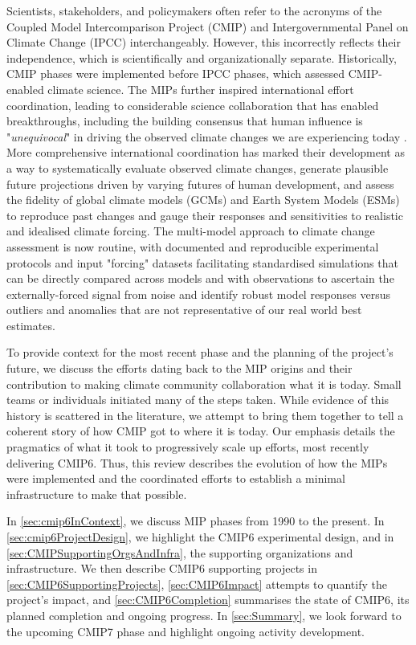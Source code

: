 \documentclass[manuscript]{copernicus}
\begin{document}
Scientists, stakeholders, and policymakers often refer to the acronyms of the Coupled Model Intercomparison Project (CMIP) and Intergovernmental Panel on Climate Change (IPCC) interchangeably. However, this incorrectly reflects their independence, which is scientifically and organizationally separate. Historically, CMIP phases were implemented before IPCC phases, which assessed CMIP-enabled climate science. The MIPs further inspired international effort coordination, leading to considerable science collaboration that has enabled breakthroughs, including the building consensus that human influence is "\textit{unequivocal}" in driving the observed climate changes we are experiencing today \citep[see \autoref{fig:fig6-MIPImpact};][]{eyring_human_2021}. More comprehensive international coordination has marked their development as a way to systematically evaluate observed climate changes, generate plausible future projections driven by varying futures of human development, and assess the fidelity of global climate models (GCMs) and Earth System Models (ESMs) to reproduce past changes and gauge their responses and sensitivities to realistic and idealised climate forcing. The multi-model approach to climate change assessment is now routine, with documented and reproducible experimental protocols and input "forcing" datasets facilitating standardised simulations that can be directly compared across models and with observations to ascertain the externally-forced signal from noise and identify robust model responses versus outliers and anomalies that are not representative of our real world best estimates.

To provide context for the most recent phase \citep[CMIP6;][]{eyring_overview_2016} and the planning of the project’s future, we discuss the efforts dating back to the MIP origins and their contribution to making climate community collaboration what it is today. Small teams or individuals initiated many of the steps taken. While evidence of this history is scattered in the literature, we attempt to bring them together to tell a coherent story of how CMIP got to where it is today. Our emphasis details the pragmatics of what it took to progressively scale up efforts, most recently delivering CMIP6. Thus, this review describes the evolution of how the MIPs were implemented and the coordinated efforts to establish a minimal infrastructure to make that possible.

In \autoref{sec:cmip6InContext}, we discuss MIP phases from 1990 to the present. In \autoref{sec:cmip6ProjectDesign}, we highlight the CMIP6 experimental design, and in \autoref{sec:CMIPSupportingOrgsAndInfra}, the supporting organizations and infrastructure. We then describe CMIP6 supporting projects in \autoref{sec:CMIP6SupportingProjects}, \autoref{sec:CMIP6Impact} attempts to quantify the project's impact, and \autoref{sec:CMIP6Completion} summarises the state of CMIP6, its planned completion and ongoing progress. In \autoref{sec:Summary}, we look forward to the upcoming CMIP7 phase and highlight ongoing activity development.
\end{document}
